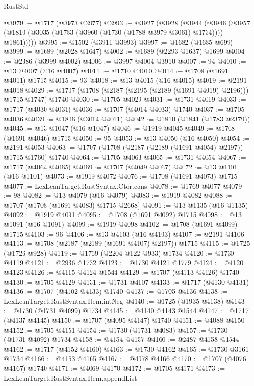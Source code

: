 \begin{lexlean}{RustStd}
\begin{coremodule}
@3979 := @1717 (@3973 @3977)
@3993 := @3927
    (@3928
      (@3944
        (@3946 (@3957 (@1810 (@3035 (@1783 (@3960 (@1730 (@1788 @3979 @3061) @1734)))) @1861)))))
@3995 := @1502 (@3911 @3993)
@3997 := @1682 (@1685 @699)
@3999 := @1689 (@2028 @1647)
@4002 := @1689 (@2293 @1637) @1699
@4004 := @2386 (@3999 @4002)
@4006 := @3997 @4004 @3910
@4007 := 94
@4010 := @13 @4007 (@16 @4007)
@4011 := @1710 @4010
@4014 := @1708 (@1691 @4011) @1715
@4015 := 93
@4018 := @13 @4015 (@16 @4015)
@4019 := @2191 @4018
@4029 := @1707 (@1708 (@2187 (@2195 (@2189 (@1691 @4019) @2196))) @1715 @1747) @1740
@4030 := @1705 @4029
@4031 := @1731 @4019
@4033 := @1717 (@4030 @4031)
@4036 := @1707 (@4014 @4033) @1740
@4037 := @1705 @4036
@4039 := @1806 (@3014 @4011)
@4042 := @1810 (@1841 (@1783 @2379))
@4045 := @13 @1047 (@16 @1047)
@4046 := @1919 @4045
@4049 := @1708 (@1691 @4046) @1715
@4050 := 95
@4053 := @13 @4050 (@16 @4050)
@4054 := @2191 @4053
@4063 := @1707 (@1708 (@2187 (@2189 (@1691 @4054) @2197)) @1715 @1760) @1740
@4064 := @1705 @4063
@4065 := @1731 @4054
@4067 := @1717 (@4064 @4065)
@4069 := @1707 (@4049 @4067)
@4072 := @13 @1101 (@16 @1101)
@4073 := @1919 @4072
@4076 := @1708 (@1691 @4073) @1715
@4077 := LexLeanTarget.RustSyntax.Ctor.cons
@4078 := @1769 @4077
@4079 := 98
@4082 := @13 @4079 (@16 @4079)
@4083 := @1919 @4082
@4088 := @1707 (@1708 (@1691 @4083) @1715 @2668)
@4091 := @13 @1135 (@16 @1135)
@4092 := @1919 @4091
@4095 := @1708 (@1691 @4092) @1715
@4098 := @13 @1091 (@16 @1091)
@4099 := @1919 @4098
@4102 := @1708 (@1691 @4099) @1715
@4103 := 96
@4106 := @13 @4103 (@16 @4103)
@4107 := @2191 @4106
@4113 := @1708 (@2187 (@2189 (@1691 @4107) @2197)) @1715
@4115 := @1725 (@1726 @928)
@4119 := @1769 (@2204 @122 @933) @1734
@4120 := @1730 @4119
@4121 := @2936 @1732
@4123 := @1730 @4121 @1779
@4124 := @4120 @4123
@4126 := @4115 @4124 @1544
@4129 := @1707 (@4113 @4126) @1740
@4130 := @1705 @4129
@4131 := @1731 @4107
@4133 := @1717 (@4130 @4131)
@4136 := @1707 (@4102 @4133) @1740
@4137 := @1705 @4136
@4138 := LexLeanTarget.RustSyntax.Item.intNeg
@4140 := @1725 (@1935 @4138)
@4143 := @1730 (@1731 @4099) @1734
@4145 := @4140 @4143 @1544
@4147 := @1717 (@4137 @4145)
@4150 := @1707 (@4095 @4147) @1740
@4151 := @4088 @4150
@4152 := @1705 @4151
@4154 := @1730 (@1731 @4083)
@4157 := @1730 (@1731 @4092) @1734
@4158 := @4154 @4157
@4160 := @2487 @4158 @1544
@4162 := @1717 (@4152 @4160)
@4163 := @1730 @4162
@4165 := @1730 @3161 @1734
@4166 := @4163 @4165
@4167 := @4078 @4166
@4170 := @1707 (@4076 @4167) @1740
@4171 := @4069 @4170
@4172 := @1705 @4171
@4173 := LexLeanTarget.RustSyntax.Item.appendList

\end{coremodule}
\end{lexlean}
